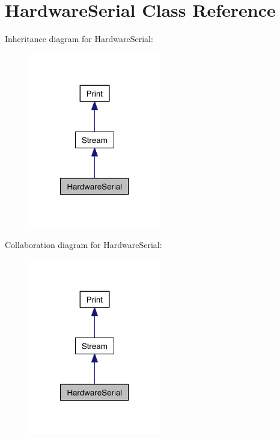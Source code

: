 \hypertarget{classHardwareSerial}{
\section{\-Hardware\-Serial \-Class \-Reference}
\label{classHardwareSerial}
}


\-Inheritance diagram for \-Hardware\-Serial\-:\nopagebreak
\begin{figure}[H]
\begin{center}
\leavevmode
\includegraphics[width=164pt]{classHardwareSerial__inherit__graph}
\end{center}
\end{figure}


\-Collaboration diagram for \-Hardware\-Serial\-:\nopagebreak
\begin{figure}[H]
\begin{center}
\leavevmode
\includegraphics[width=164pt]{classHardwareSerial__coll__graph}
\end{center}
\end{figure}
